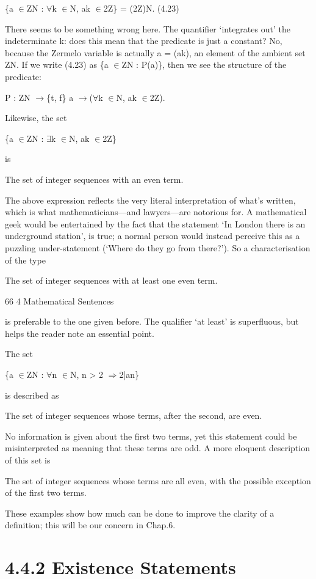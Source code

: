 \documentclass[11pt]{article}
\theoremstyle{plain}
\theoremstyle{definition}
\begin{document}
\{a $\in$ZN : $\forall$k $\in$N, ak $\in$2Z\} = (2Z)N. (4.23)

There seems to be something wrong here. The quantifier `integrates out' the indeterminate k: does this mean that the predicate is just a constant? No, because the Zermelo variable is actually a = (ak), an element of the ambient set ZN. If we write (4.23) as \{a $\in$ZN : P(a)\}, then we see the structure of the predicate:

P : ZN $\to$\{t, f\} a $\to$($\forall$k $\in$N, ak $\in$2Z).

Likewise, the set

\{a $\in$ZN : $\exists$k $\in$N, ak $\in$2Z\}

is

The set of integer sequences with an even term.

The above expression reflects the very literal interpretation of what's written, which is what mathematicians---and lawyers---are notorious for. A mathematical geek would be entertained by the fact that the statement `In London there is an underground station', is true; a normal person would instead perceive this as a puzzling under-statement (`Where do they go from there?'). So a characterisation of the type

The set of integer sequences with at least one even term.

66 4 Mathematical Sentences

is preferable to the one given before. The qualifier `at least' is superfluous, but helps the reader note an essential point.

The set

\{a $\in$ZN : $\forall$n $\in$N, n > 2 $\Rightarrow$2|an\}

is described as

The set of integer sequences whose terms, after the second, are even.

No information is given about the first two terms, yet this statement could be misinterpreted as meaning that these terms are odd. A more eloquent description of this set is

The set of integer sequences whose terms are all even, with the possible exception of the first two terms.

These examples show how much can be done to improve the clarity of a definition; this will be our concern in Chap.6.

\section{4.4.2 Existence Statements}
\end{document}

